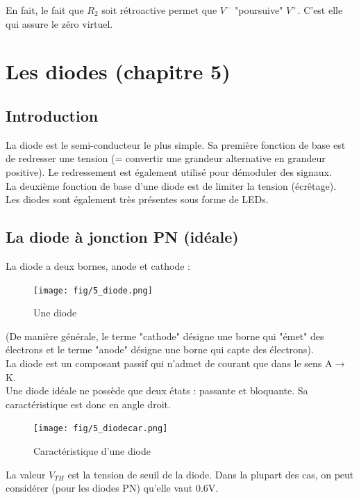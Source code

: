 \documentclass[a4paper]{article}
\begin{document}
    En fait, le fait que $R_2$ soit rétroactive permet que $V^-$ "poursuive" $V^+$.
    C'est elle qui assure le zéro virtuel.

\section{Les diodes (chapitre 5)}
    
    \subsection{Introduction}
    La diode est le semi-conducteur le plus simple. Sa première fonction de base est de 
    redresser une tension (= convertir une grandeur alternative en grandeur positive).
    Le redressement est également utilisé pour démoduler des signaux.\\

    La deuxième fonction de base d'une diode est de limiter la tension (écrêtage).\\

    Les diodes sont également très présentes sous forme de LEDs.

    \subsection{La diode à jonction PN (idéale)}
    La diode a deux bornes, anode et cathode :
    \begin{figure}[H]
        \begin{center}
            \texttt{[image: fig/5\_diode.png]}
            \caption{Une diode}
            \label{fig:5_diode}
        \end{center}
    \end{figure}

    (De manière générale, le terme "cathode" désigne une borne qui "émet" des électrons
    et le terme "anode" désigne une borne qui capte des électrons).\\

    La diode est un composant passif qui n'admet de courant que dans le sens A$\rightarrow$K.\\

    Une diode idéale ne possède que deux états : passante et bloquante. Sa 
    caractéristique est donc en angle droit.
    \begin{figure}[H]
        \begin{center}
            \texttt{[image: fig/5\_diodecar.png]}
            \caption{Caractéristique d'une diode}
            \label{fig:5_diodecar}
        \end{center}
    \end{figure}
    La valeur $V_{TH}$ est la tension de seuil de la diode. Dans la plupart des cas,
    on peut considérer (pour les diodes PN) qu'elle vaut 0.6V.
\end{document}
